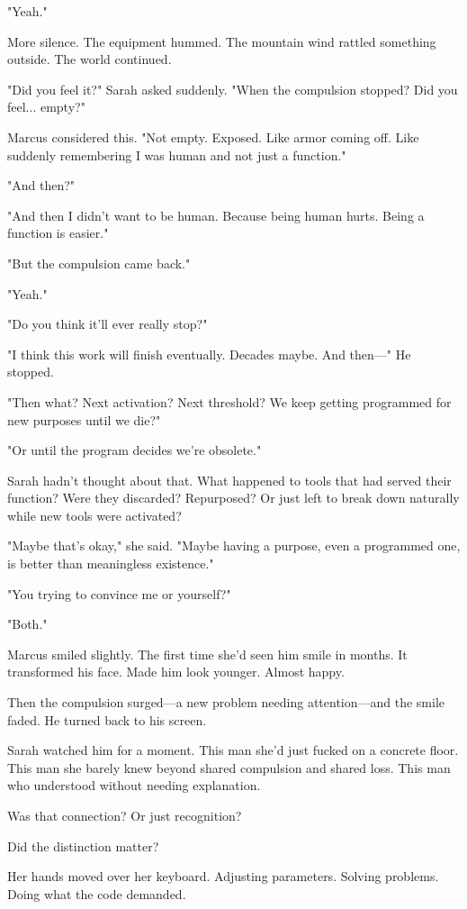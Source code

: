"Yeah."

More silence. The equipment hummed. The mountain wind rattled something outside. The world continued.

"Did you feel it?" Sarah asked suddenly. "When the compulsion stopped? Did you feel... empty?"

Marcus considered this. "Not empty. Exposed. Like armor coming off. Like suddenly remembering I was human and not just a function."

"And then?"

"And then I didn't want to be human. Because being human hurts. Being a function is easier."

"But the compulsion came back."

"Yeah."

"Do you think it'll ever really stop?"

"I think this work will finish eventually. Decades maybe. And then—" He stopped.

"Then what? Next activation? Next threshold? We keep getting programmed for new purposes until we die?"

"Or until the program decides we're obsolete."

Sarah hadn't thought about that. What happened to tools that had served their function? Were they discarded? Repurposed? Or just left to break down naturally while new tools were activated?

"Maybe that's okay," she said. "Maybe having a purpose, even a programmed one, is better than meaningless existence."

"You trying to convince me or yourself?"

"Both."

Marcus smiled slightly. The first time she'd seen him smile in months. It transformed his face. Made him look younger. Almost happy.

Then the compulsion surged—a new problem needing attention—and the smile faded. He turned back to his screen.

Sarah watched him for a moment. This man she'd just fucked on a concrete floor. This man she barely knew beyond shared compulsion and shared loss. This man who understood without needing explanation.

Was that connection? Or just recognition?

Did the distinction matter?

Her hands moved over her keyboard. Adjusting parameters. Solving problems. Doing what the code demanded.

